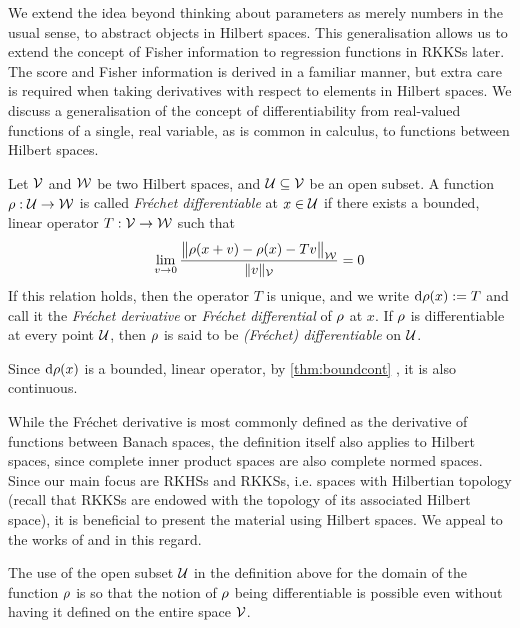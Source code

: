We extend the idea beyond thinking about parameters as merely numbers in the usual sense, to abstract objects in Hilbert spaces. 
This generalisation allows us to extend the concept of Fisher information to regression functions in RKKSs later.
The score and Fisher information is derived in a familiar manner, but extra care is required when taking derivatives with respect to elements in Hilbert spaces.  
We discuss a generalisation of the concept of differentiability from real-valued functions of a single, real variable, as is common in calculus, to functions between Hilbert spaces.

\begin{definition}\label{def:frechet}
  Let ${\mathcal V}$ and ${\mathcal W}$ be two Hilbert spaces, and ${\mathcal U} \subseteq {\mathcal V}$ be an open subset.
  A function $\rho :{\mathcal U}\to{\mathcal W}$ is called \emph{Fréchet differentiable} at $x \in {\mathcal U}$ if there exists a bounded, linear operator $T:{\mathcal V}\to{\mathcal W}$ such that 
  \[
    \lim_{v\to 0} \frac{\big\Vert \rho(x+v) - \rho(x) - T v \big\Vert_{{\mathcal W}}}{\lVert v\rVert_{\mathcal V}} = 0
  \]
  If this relation holds, then the operator $T$ is unique, and we write $\text{d} \rho(x) := T$ and call it the \emph{Fréchet derivative} or \emph{Fréchet differential} of $\rho$ at $x$.
  If $\rho$ is differentiable at every point ${\mathcal U}$, then $\rho$ is said to be \emph{(Fréchet) differentiable} on ${\mathcal U}$.
\end{definition}

\begin{remark}
  Since $\text{d} \rho(x)$ is a bounded, linear operator, by \cref{thm:boundcont} , it is also continuous. 
\end{remark}

\begin{remark}
  While the Fréchet derivative is most commonly defined as the derivative of functions between Banach spaces,  the definition itself also applies to Hilbert spaces, since complete inner product spaces are also complete normed spaces.
  Since our main focus are RKHSs and RKKSs, i.e. spaces with Hilbertian topology (recall that RKKSs are endowed with the topology of its associated Hilbert space), it is beneficial to present the material using Hilbert spaces.
  We appeal to the works of \citet[def. 3.6.5]{balakrishnan1981applied} and \citet[sec. 6]{bouboulis2011extension} in this regard.
\end{remark}

\begin{remark}
  The use of the open subset ${\mathcal U}$ in the definition above for the domain of the function $\rho$ is so that the notion of $\rho$ being differentiable is possible even without having it defined on the entire space ${\mathcal V}$.
\end{remark}

